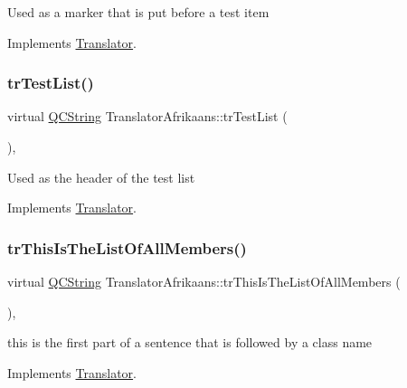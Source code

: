 Used as a marker that is put before a test item 

Implements \mbox{\hyperlink{class_translator}{Translator}}.

\mbox{\label{class_translator_afrikaans_ab989211b87fe3f67c537ce0107aa0a04}} 
\subsubsection{\texorpdfstring{trTestList()}{trTestList()}}
{\footnotesize\ttfamily virtual \mbox{\hyperlink{class_q_c_string}{Q\+C\+String}} Translator\+Afrikaans\+::tr\+Test\+List (\begin{DoxyParamCaption}{ }\end{DoxyParamCaption})\hspace{0.3cm}{\ttfamily [inline]}, {\ttfamily [virtual]}}

Used as the header of the test list 

Implements \mbox{\hyperlink{class_translator}{Translator}}.

\mbox{\label{class_translator_afrikaans_a335b943053f6882f8af8101bea1e79e7}} 
\subsubsection{\texorpdfstring{trThisIsTheListOfAllMembers()}{trThisIsTheListOfAllMembers()}}
{\footnotesize\ttfamily virtual \mbox{\hyperlink{class_q_c_string}{Q\+C\+String}} Translator\+Afrikaans\+::tr\+This\+Is\+The\+List\+Of\+All\+Members (\begin{DoxyParamCaption}{ }\end{DoxyParamCaption})\hspace{0.3cm}{\ttfamily [inline]}, {\ttfamily [virtual]}}

this is the first part of a sentence that is followed by a class name 

Implements \mbox{\hyperlink{class_translator}{Translator}}.

\mbox{\label{class_translator_afrikaans_a91f2da0b06533ee775c4209daea1f2c9}} 
